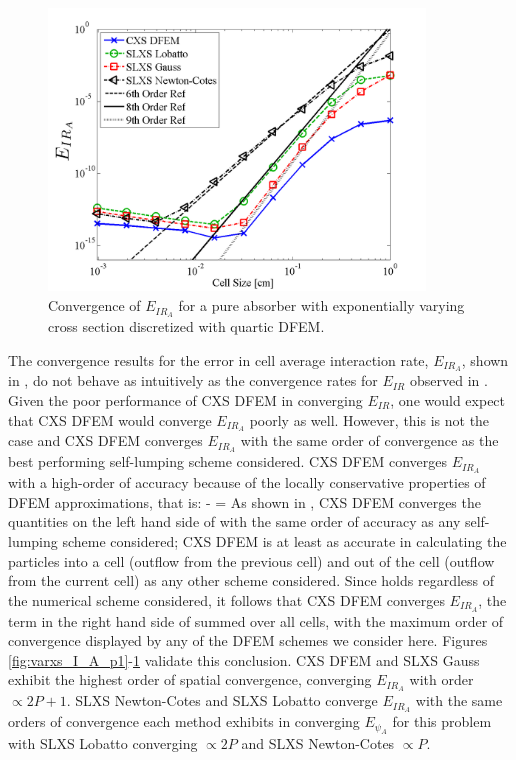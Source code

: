 \begin{figure}[!hbp]
\centering
\includegraphics[width=10cm]{chapter3_variable_xs/P4_VarXS_E_I_A.png}
\caption{Convergence of $E_{IR_A}$ for a pure absorber with exponentially varying cross section discretized with quartic DFEM.}
\label{fig:varxs_I_A_p4}
\end{figure}
The convergence results for the error in cell average interaction rate, $E_{IR_A}$, shown in , do not behave as intuitively as the convergence rates for $E_{IR}$ observed in .  
Given the poor performance of CXS DFEM in converging $E_{IR}$, one would expect that CXS DFEM would converge $E_{IR_A}$ poorly as well.  
However, this is not the case and CXS DFEM converges $E_{IR_A}$ with the same order of convergence as the best performing self-lumping scheme considered.
CXS DFEM converges $E_{IR_A}$ with a high-order of accuracy because of the locally conservative properties of DFEM approximations, that is:
\benum
{} -  =   \pep
\label{eq:chap3_balance}
\eenum
As shown in , CXS DFEM converges the quantities on the left hand side of  with the same order of accuracy as any self-lumping scheme considered; CXS DFEM is at least as accurate in calculating the particles into a cell (outflow from the previous cell) and out of the cell (outflow from the current cell) as any other scheme considered.
Since  holds regardless of the numerical scheme considered, it follows that CXS DFEM converges $E_{IR_A}$, the term in the right hand side of  summed over all cells, with the maximum order of convergence displayed by any of the DFEM schemes we consider here.
Figures \ref{fig:varxs_I_A_p1}-\ref{fig:varxs_I_A_p4} validate this conclusion.
CXS DFEM and SLXS Gauss exhibit the highest order of spatial convergence, converging $E_{IR_A}$ with order $\propto 2P + 1$.  
SLXS Newton-Cotes and SLXS Lobatto converge $E_{IR_A}$ with the same orders of convergence each method exhibits in converging $E_{\psi_A}$ for this problem with SLXS Lobatto converging $\propto 2P$ and SLXS Newton-Cotes $\propto P$.

